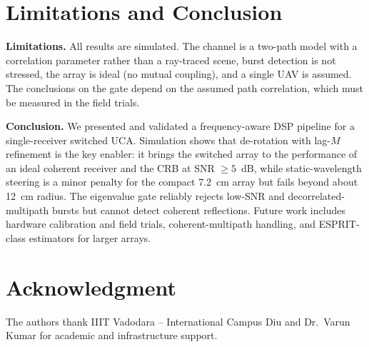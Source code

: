 \documentclass[conference]{IEEEtran}
\begin{document}
\section{Limitations and Conclusion}\label{sec:conclusion}
\textbf{Limitations.} All results are simulated. The channel is a two-path model with a correlation parameter rather than a ray-traced scene, burst detection is not stressed, the array is ideal (no mutual coupling), and a single UAV is assumed. The conclusions on the gate depend on the assumed path correlation, which must be measured in the field trials.

\textbf{Conclusion.} We presented and validated a frequency-aware DSP pipeline for a single-receiver switched UCA. Simulation shows that de-rotation with lag-$M$ refinement is the key enabler: it brings the switched array to the performance of an ideal coherent receiver and the CRB at SNR $\ge5$~dB, while static-wavelength steering is a minor penalty for the compact 7.2~cm array but fails beyond about 12~cm radius. The eigenvalue gate reliably rejects low-SNR and decorrelated-multipath bursts but cannot detect coherent reflections. Future work includes hardware calibration and field trials, coherent-multipath handling, and ESPRIT-class estimators for larger arrays.

\section*{Acknowledgment}
The authors thank IIIT Vadodara -- International Campus Diu and Dr.\ Varun Kumar for academic and infrastructure support.
\end{document}
